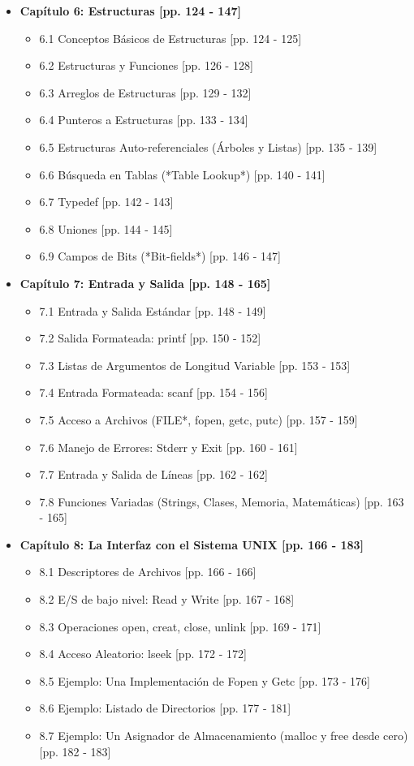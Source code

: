 \documentclass[11pt,a4paper]{article}
\begin{document}
\begin{itemize}
    \item \textbf{Capítulo 6: Estructuras [pp. 124 - 147]}
    \begin{itemize}
        \item 6.1 Conceptos Básicos de Estructuras [pp. 124 - 125]
        \item 6.2 Estructuras y Funciones [pp. 126 - 128]
        \item 6.3 Arreglos de Estructuras [pp. 129 - 132]
        \item 6.4 Punteros a Estructuras [pp. 133 - 134]
        \item 6.5 Estructuras Auto-referenciales (Árboles y Listas) [pp. 135 - 139]
        \item 6.6 Búsqueda en Tablas (*Table Lookup*) [pp. 140 - 141]
        \item 6.7 Typedef [pp. 142 - 143]
        \item 6.8 Uniones [pp. 144 - 145]
        \item 6.9 Campos de Bits (*Bit-fields*) [pp. 146 - 147]
    \end{itemize}

    \item \textbf{Capítulo 7: Entrada y Salida [pp. 148 - 165]}
    \begin{itemize}
        \item 7.1 Entrada y Salida Estándar [pp. 148 - 149]
        \item 7.2 Salida Formateada: printf [pp. 150 - 152]
        \item 7.3 Listas de Argumentos de Longitud Variable [pp. 153 - 153]
        \item 7.4 Entrada Formateada: scanf [pp. 154 - 156]
        \item 7.5 Acceso a Archivos (FILE*, fopen, getc, putc) [pp. 157 - 159]
        \item 7.6 Manejo de Errores: Stderr y Exit [pp. 160 - 161]
        \item 7.7 Entrada y Salida de Líneas [pp. 162 - 162]
        \item 7.8 Funciones Variadas (Strings, Clases, Memoria, Matemáticas) [pp. 163 - 165]
    \end{itemize}

    \item \textbf{Capítulo 8: La Interfaz con el Sistema UNIX [pp. 166 - 183]}
    \begin{itemize}
        \item 8.1 Descriptores de Archivos [pp. 166 - 166]
        \item 8.2 E/S de bajo nivel: Read y Write [pp. 167 - 168]
        \item 8.3 Operaciones open, creat, close, unlink [pp. 169 - 171]
        \item 8.4 Acceso Aleatorio: lseek [pp. 172 - 172]
        \item 8.5 Ejemplo: Una Implementación de Fopen y Getc [pp. 173 - 176]
        \item 8.6 Ejemplo: Listado de Directorios [pp. 177 - 181]
        \item 8.7 Ejemplo: Un Asignador de Almacenamiento (malloc y free desde cero) [pp. 182 - 183]
    \end{itemize}


\end{itemize}
\end{document}
